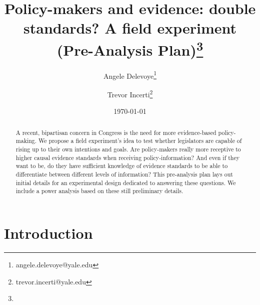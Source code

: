 \documentclass[12pt,final,fleqn]{article}
\theoremstyle{plain}
\begin{document}
\singlespace
\title{\textbf{Policy-makers and evidence: double standards? A field experiment (Pre-Analysis Plan)}\vspace{-1ex}\thanks{}}
\author{Angele Delevoye\thanks{angele.delevoye@yale.edu}\vspace{-1ex}}
\author{Trevor Incerti\thanks{trevor.incerti@yale.edu}\vspace{-1ex}}
\date{\today}
\maketitle

\begin{abstract}
A recent, bipartisan concern in Congress is the need for more evidence-based policy-making. We propose a field experiment's idea to test whether legislators are capable of rising up to their own intentions and goals. Are policy-makers really more receptive to higher causal evidence standards when receiving policy-information? And even if they want to be, do they have sufficient knowledge of evidence standards to be able to differentiate between different levels of information? This pre-analysis plan lays out initial details for an experimental design dedicated to answering these questions. We include a power analysis based on these still preliminary details. 
\end{abstract}

\pagebreak

\doublespace

\begin{center}
\end{center}

\section{Introduction} \label{sec:Introduction}
\end{document}
